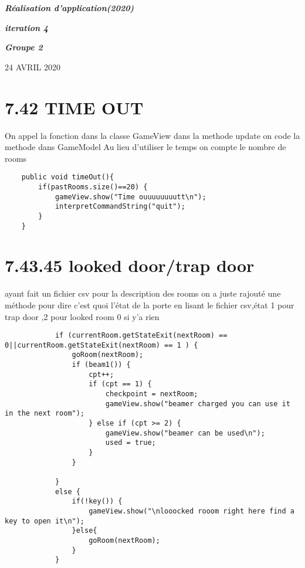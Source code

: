 \documentclass[a4paper , 10pt]{article}
\begin{document}
\begin{center}
\begin{huge}
\textit{\textbf{Réalisation d'application(2020)}}
\end{huge}
\end{center}
\begin{center}
\begin{LARGE}
\textit{\textbf{iteration 4}}
\end{LARGE}
\end{center}
\textit{}
\textit{}
\begin{center}
\begin{flushleft}
\begin{Large}
\textbf{\textit{Groupe 2}}
\end{Large}
\end{flushleft}
\end{center}
\begin{center}
24 AVRIL 2020
\end{center}
\section{7.42 TIME OUT}
On appel la fonction dans la classe GameView dans la methode update on code la methode dans GameModel Au lieu d’utiliser le temps on compte le nombre de rooms

\begin{verbatim}
    public void timeOut(){
        if(pastRooms.size()==20) {
            gameView.show("Time ouuuuuuuutt\n");
            interpretCommandString("quit");
        }
    }
\end{verbatim}

\section{7.43.45 looked door/trap door}
ayant fait un fichier csv pour la description  des rooms on a juste rajouté une méthode pour dire c'est quoi l'état de la porte en lisant le fichier csv,état 1 pour trap door ,2 pour looked room 0 si y'a rien

\begin{verbatim}
            if (currentRoom.getStateExit(nextRoom) == 0||currentRoom.getStateExit(nextRoom) == 1 ) {
                goRoom(nextRoom);
                if (beam1()) {
                    cpt++;
                    if (cpt == 1) {
                        checkpoint = nextRoom;
                        gameView.show("beamer charged you can use it in the next room");
                    } else if (cpt >= 2) {
                        gameView.show("beamer can be used\n");
                        used = true;
                    }
                }

            }
            else {
                if(!key()) {
                    gameView.show("\nlooocked rooom right here find a key to open it\n");
                }else{
                    goRoom(nextRoom);
                }
            }
\end{verbatim}
\end{document}
